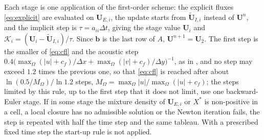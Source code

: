 Each stage is one application of the first-order scheme: the explicit fluxes \eqref{eq:explicit} are evaluated on
$\mathbf U_{E,i}$, the update starts from $\tilde{\mathbf U}_{I,i}$ instead of $\mathbf U^n$, and the implicit step is $\tau=a_{ii}\Delta t$, giving the stage
value $\mathbf U_i$ and $\mathcal K_i=(\mathbf U_i-\tilde{\mathbf U}_{I,i})/\tau$. Since $\mathbf b$ is the last row of $A$, $\mathbf U^{n+1}=\mathbf U_2$. The first step is the smaller
of \eqref{eq:cfl} and the acoustic step $0.4\big(\max_\Omega(|u|+c_f)/\Delta x+\max_\Omega(|v|+c_f)/\Delta y\big)^{-1}$, as in \cite{BattistiBoscheri2025}, and no step
may exceed $1.2$ times the previous one, so that \eqref{eq:cfl} is reached after about $\ln(0.5/M_\Omega)/\ln1.2$ steps,
$M_\Omega=\max_\Omega|u|/\max_\Omega(|u|+c_f)$; the steps limited by this rule, up to the first step that it does not limit, use one
backward-Euler stage. If in some stage the mixture density of $\mathbf U_{E,i}$ or $X^*$ is non-positive in a cell, a local closure has
no admissible solution or the Newton iteration fails, the step is repeated with half the time step and the same
tableau. With a prescribed fixed time step the start-up rule is not applied.

